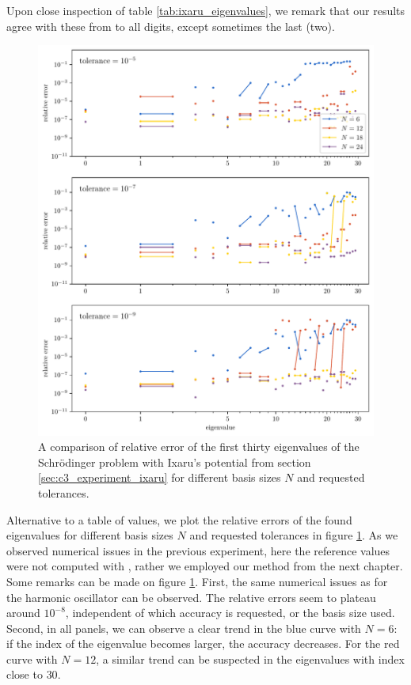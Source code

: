 Upon close inspection of table \ref{tab:ixaru_eigenvalues}, we remark that our results agree with these from \cite{ixaru_new_2010} to all digits, except sometimes the last (two).

\begin{figure}
  \begin{center}
    \includegraphics[width=\textwidth]{img/chapter3/experiments/ixaru.pdf}
  \end{center}
  \caption{A comparison of relative error of the first thirty eigenvalues of the Schrödinger problem with Ixaru's potential from section \ref{sec:c3_experiment_ixaru} for different basis sizes $N$ and requested tolerances.}\label{fig:c3_experiment_ixaru}
\end{figure}

Alternative to a table of values, we plot the relative errors of the found eigenvalues for different basis sizes $N$ and requested tolerances in figure \ref{fig:c3_experiment_ixaru}. As we observed numerical issues in the previous experiment, here the reference values were not computed with \pyslisetd{}, rather we employed our method from the next chapter. Some remarks can be made on figure \ref{fig:c3_experiment_ixaru}. First, the same numerical issues as for the harmonic oscillator can be observed. The relative errors seem to plateau around $10^{-8}$, independent of which accuracy is requested, or the basis size used. Second, in all panels, we can observe a clear trend in the blue curve with $N = 6$: if the index of the eigenvalue becomes larger, the accuracy decreases. For the red curve with $N = 12$,  a similar trend can be suspected in the eigenvalues with index close to $30$.

